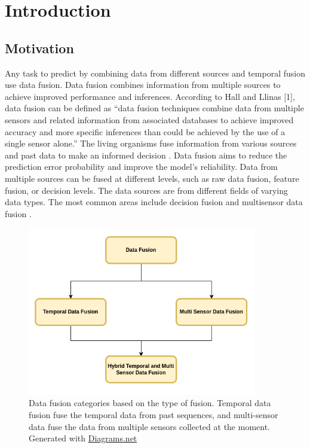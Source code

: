 
    \chapter{Introduction}
	\label{chap:introduction}
	
	\section{Motivation}
		
	Any task to predict by combining data from different sources and temporal fusion use data fusion. Data fusion combines information from multiple sources to achieve improved performance and inferences. According to Hall and Llinas [1], data fusion can be defined as ``data fusion techniques combine data from multiple sensors and related information from associated databases to achieve improved accuracy and more specific inferences than could be achieved by the use of a single sensor alone.” The living organisms fuse information from various sources and past data to make an informed decision \cite{01_mandic2005data}.  
	Data fusion aims to reduce the prediction error probability and improve the model's reliability. Data from multiple sources can be fused at different levels, such as raw data fusion, feature fusion, or decision levels. The data sources are from different fields of varying data types. The most common areas include decision fusion and multisensor data fusion \cite{06_castanedo2013review}. 
	
	\begin{figure}[h]
		\centering
		\includegraphics[width=10cm]{images/df.png}
		\caption{Data fusion categories based on the type of fusion. Temporal data fusion fuse the temporal data from past sequences, and multi-sensor data fuse the data from multiple sensors collected at the moment. Generated with \href{https://app.diagrams.net/}{Diagrams.net} }
		\label{fig:3D_reconstruction}
	\end{figure}

